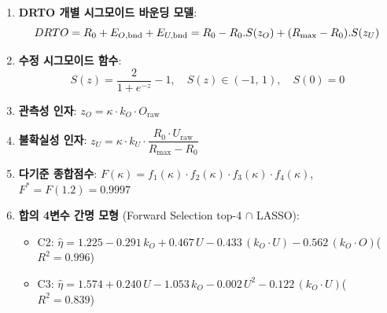 \begin{enumerate}[leftmargin=2em]

\item \textbf{DRTO 개별 시그모이드 바운딩 모델}:
\[
  DRTO = R_0 + E_{O,\text{bnd}} + E_{U,\text{bnd}}
  = R_0 - R_0 . S(z_O) + (R_{\max} - R_0) . S(z_U)
\]

\item \textbf{수정 시그모이드 함수}:
\[
  S(z) = \frac{2}{1 + e^{-z}} - 1, \quad S(z) \in (-1,\,1), \quad S(0) = 0
\]

\item \textbf{관측성 인자}: $z_O = \kappa \cdot k_O \cdot O_{\text{raw}}$

\item \textbf{불확실성 인자}: $z_U = \kappa \cdot k_U \cdot \dfrac{R_0 \cdot U_{\text{raw}}}{R_{\max} - R_0}$

\item \textbf{다기준 종합점수}:
$F(\kappa) = f_1(\kappa) \cdot f_2(\kappa) \cdot f_3(\kappa) \cdot f_4(\kappa)$,
\quad $F^* = F(1.2) = 0.9997$ 

\item \textbf{합의 4변수 간명 모형} (Forward Selection top-4 $\cap$ LASSO):
\begin{itemize}
  \item C2: $\hat{\eta} = 1.225 - 0.291\,k_O + 0.467\,U - 0.433\,(k_O \!\cdot\! U) - 0.562\,(k_O \!\cdot\! O)$\quad ($R^2 = 0.996$)
  \item C3: $\hat{\eta} = 1.574 + 0.240\,U - 1.053\,k_O - 0.002\,U^2 - 0.122\,(k_O \!\cdot\! U)$\quad ($R^2 = 0.839$)
\end{itemize}

\end{enumerate}


\label{app:key-terms}

